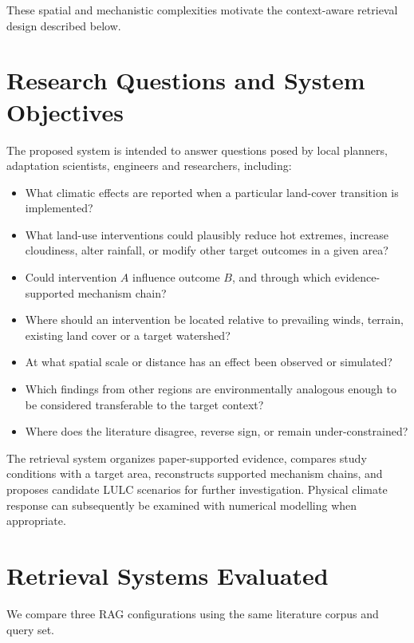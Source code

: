 \documentclass[10pt,twocolumn]{article}
\begin{document}
These spatial and mechanistic complexities motivate the context-aware retrieval design described below.

\section{Research Questions and System Objectives}

The proposed system is intended to answer questions posed by local planners, adaptation scientists, engineers and researchers, including:

\begin{itemize}
  \item What climatic effects are reported when a particular land-cover transition is implemented?
  \item What land-use interventions could plausibly reduce hot extremes, increase cloudiness, alter rainfall, or modify other target outcomes in a given area?
  \item Could intervention $A$ influence outcome $B$, and through which evidence-supported mechanism chain?
  \item Where should an intervention be located relative to prevailing winds, terrain, existing land cover or a target watershed?
  \item At what spatial scale or distance has an effect been observed or simulated?
  \item Which findings from other regions are environmentally analogous enough to be considered transferable to the target context?
  \item Where does the literature disagree, reverse sign, or remain under-constrained?
\end{itemize}

The retrieval system organizes paper-supported evidence, compares study conditions with a target area, reconstructs supported mechanism chains, and proposes candidate LULC scenarios for further investigation. Physical climate response can subsequently be examined with numerical modelling when appropriate.

\section{Retrieval Systems Evaluated}

We compare three RAG configurations using the same literature corpus and query set.
\end{document}
